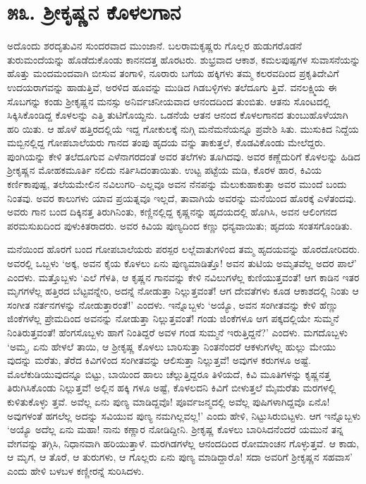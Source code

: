 
\chapter{೫೩. ಶ್ರೀಕೃಷ್ಣನ ಕೊಳಲಗಾನ}

ಅದೊಂದು ಶರದೃತುವಿನ ಸುಂದರವಾದ ಮುಂಜಾನೆ. ಬಲರಾಮಕೃಷ್ಣರು ಗೊಲ್ಲರ ಹುಡುಗರೊಡನೆ ತುರುಮಂದೆಯನ್ನು ಹೊಡೆದುಕೊಂಡು ಕಾನನದತ್ತ ಹೊರಟರು. ಶುಭ್ರವಾದ ಆಕಾಶ, ಕಮಲಪುಷ್ಪಗಳ ಸುವಾಸನೆಯನ್ನು ಹೊತ್ತು ಮಂದಮಂದವಾಗಿ ಬೀಸುವ ತಂಗಾಳಿ, ನೂರಾರು ಬಗೆಯ ಹಕ್ಕಿಗಳು ತಮ್ಮ ಕಲರವದಿಂದ ಪ್ರಕೃತಿದೇವಿಗೆ ಉದಯರಾಗವನ್ನು ಹಾಡುತ್ತಿವೆ, ಅರಳಿದ ಹೂವನ್ನು ಮುಡಿದ ಗಿಡಬಳ್ಳಿಗಳು ತಲೆದೂಗು ತ್ತಿವೆ. ವನಲಕ್ಷ್ಮಿಯ ಈ ಸೊಬಗನ್ನು ಕಂಡು ಶ್ರೀಕೃಷ್ಣನ ಮನಸ್ಸು ಅನಿರ್ವಚನೀಯವಾದ ಆನಂದದಿಂದ ತುಂಬಿತು. ಆತನು ಸೊಂಟದಲ್ಲಿ ಸಿಕ್ಕಿಸಿಕೊಂಡಿದ್ದ ಕೊಳಲನ್ನು ಎತ್ತಿ ತುಟಿಗೊಯ್ದನು. ಒಡನೆಯೆ ಆತನ ಆನಂದ ಕೊಳಲಗಾನದ ತುಂಬುಹೊಳೆಯಾಗಿ ಹರಿ ಯಿತು. ಆ ಹೊಳೆ ಹತ್ತಿರದಲ್ಲಿಯೆ ಇದ್ದ ಗೋಕುಲಕ್ಕೆ ನುಗ್ಗಿ ಮನೆಮನೆಯನ್ನೂ ಪ್ರವೇಶಿ ಸಿತು. ಮುಸುಕಿದ ನಿದ್ದೆಯ ಮಬ್ಬಿನಲ್ಲಿದ್ದ ಗೋಪಬಾಲೆಯರು ಗಾನದ ತಂಪು ಹೃದಯ ವನ್ನು ತಾಕುತ್ತಲೆ, ಕೊಡವಿಕೊಂಡು ಮೇಲೆದ್ದರು. ಪುಂಗಿಯನ್ನು ಕೇಳಿ ತಲೆದೂಗುವ ಎಳೆನಾಗರದಂತೆ ಅವರ ತಲೆಗಳು ತೂಗಿದವು. ಅವರ ಕಣ್ಣೆದುರಿಗೆ ಕೊಳಲನ್ನು ಹಿಡಿದ ಶ್ರೀಕೃಷ್ಣನ ಮೋಹಕಮೂರ್ತಿ ನಲಿದು ನರ್ತಿಸಿದಂತಾಯಿತು. ಉಟ್ಟ ಪಟ್ಟೆಯ ಮಡಿ, ಕೊರಳ ಹಾರ, ಕಿವಿಯ ಕರ್ಣಿಕಾಪುಷ್ಪ, ತಲೆಯಮೇಲಿನ ನವಿಲುಗರಿ–ಎಲ್ಲವೂ ಅವನ ನೆನಪನ್ನು ಮೆಲುಕುಹಾಕುತ್ತಾ ಅವರ ಮುಂದೆ ಬಂದು ನಿಂತವು. ಅವರ ಕಾಲುಗಳು ಯಾವ ಪ್ರಯತ್ನವೂ ಇಲ್ಲದೆ, ತಾವಾಗಿಯೆ ಅವರನ್ನು ಮನೆಯಿಂದ ಹೊರಕ್ಕೆ ಎಳೆತಂದವು. ಅವರು ಗಾನ ಬಂದ ದಿಕ್ಕಿನತ್ತ ತಿರುಗಿನಿಂತು, ಕಣ್ಣಿನಲ್ಲಿದ್ದ ಕೃಷ್ಣನನ್ನು ಹೃದಯದಲ್ಲಿ ಹೊಗಿಸಿ, ಅವನ ಆಲಿಂಗನದ ಪರಮಸುಖದಿಂದ ಪುಳುಕಿತರಾದರು. ಅವರ ಕಿವಿಯ ಪುಣ್ಯದಿಂದ ಕಣ್ಣು ಧನ್ಯವಾಯಿತು; ಹೃದಯ ಸಂತಸಗೊಂಡಿತು.

ಮನೆಯಿಂದ ಹೊರಗೆ ಬಂದ ಗೋಪಬಾಲೆಯರು ಪರಸ್ಪರ ಲಲ್ಲೆವಾತುಗಳಿಂದ ತಮ್ಮ ಹೃದಯವನ್ನು ಹೊರದೋರಿದರು. ಅವರಲ್ಲಿ ಒಬ್ಬಳು ‘ಅಕ್ಕ, ಅವನ ಕೈಯ ಕೊಳಲು ಏನು ಪುಣ್ಯಮಾಡಿತ್ತೊ! ಅವನ ತುಟಿಯ ಅಮೃತವೆಲ್ಲ ಅದರ ಪಾಲೆ’ ಎಂದಳು. ಮತ್ತೊಬ್ಬಳು ‘ಎಲೆ ಗೆಳತಿ, ಆ ಕೃಷ್ಣನ ಗಾನವನ್ನು ಕೇಳಿ ನವಿಲುಗಳೆಲ್ಲ ಕುಣಿಯುತ್ತವಂತೆ! ಆಗ ಕಾಡಿನ ಇತರ ಮೃಗಗಳೆಲ್ಲ ಹತ್ತಿರದ ಬೆಟ್ಟವನ್ನೇರಿ, ಅದನ್ನೆ ನೋಡುತ್ತಾ ನಿಲ್ಲುತ್ತವಂತೆ! ಆಗ ದೇವತೆಗಳು ಕೂಡ ಆಕಾಶದಲ್ಲಿ ನಿಂತು ಆ ಸಂಗೀತ ನರ್ತನಗಳನ್ನು ನೋಡುತ್ತಾರಂತೆ!’ ಎಂದಳು. ಇನ್ನೊಬ್ಬಳು ‘ಅಯ್ಯೊ, ಅವನ ಸಂಗೀತವನ್ನು ಕೇಳಿ ಹೆಣ್ಣು ಜಿಂಕೆಗಳೆಲ್ಲ ಪ್ರೇಮದಿಂದ ಅವನನ್ನು ನೋಡುತ್ತಾ ನಿಲ್ಲುತ್ತವಂತೆ! ಗಂಡು ಜಿಂಕೆಗಳೂ ಆಗ ಪಕ್ಕದಲ್ಲಿಯೇ ಸುಮ್ಮನೆ ನಿಂತಿರುತ್ತವಂತೆ! ಹೆಂಗಸೊಬ್ಬಳು ಹಾಗೆ ನಿಂತಿದ್ದರೆ ಅವಳ ಗಂಡ ಸುಮ್ಮನೆ ಇರುತ್ತಿದ್ದನೆ?’ ಎಂದಳು. ಮಗದೊಬ್ಬಳು ‘ಅಮ್ಮ, ಏನು ಹೇಳಲೆ ತಾಯಿ, ಆ ಶ್ರೀಕೃಷ್ಣ ಕೊಳಲು ಬಾರಿಸುತ್ತಾ ನಿಂತನೆಂದರೆ ಆಕಳುಗಳೆಲ್ಲ ಹುಲ್ಲು ಮೇಯು ವುದನ್ನು ಮರೆತು, ತೆರೆದ ಕಿವಿಗಳಿಂದ ಸಂಗೀತವನ್ನು ಆಲಿಸುತ್ತಾ ನಿಲ್ಲುತ್ತವೆ! ಅವುಗಳ ಕರುಗಳೂ ಅಷ್ಟೆ. ಮೊಲೆಕುಡಿಯುವುದನ್ನೂ ಬಿಟ್ಟು, ಬಾಯಿಂದ ಹಾಲು ಚೆಲ್ಲುತ್ತಿದ್ದರೂ ತಿಳಿಯದೆ, ಕಿವಿ ಮೂತಿಗಳನ್ನು ಕೃಷ್ಣನತ್ತ ತಿರುಗಿಸಿಕೊಂಡು ನಿಲ್ಲುತ್ತವೆ! ಅಲ್ಲಿನ ಹಕ್ಕಿ ಗಳೂ ಅಷ್ಟೆ, ಕೊಳಲದನಿ ಕಿವಿಗೆ ಬೀಳುತ್ತಲೆ ಮೈಮರೆತು ಮರಗಳಲ್ಲಿ ಕುಳಿತುಕೊಳ್ಳು ತ್ತವೆ. ಅವೆಲ್ಲ ಏನು ಪುಣ್ಯ ಮಾಡಿದ್ದವೊ! ಪೂರ್ವಜನ್ಮದಲ್ಲಿ ಅವೆಲ್ಲ ಪುಷಿಗಳಾಗಿದ್ದವೊ ಏನೊ! ಅವುಗಳಂತೆ ಹಗಲೆಲ್ಲ ಅದನ್ನು ಸವಿಯುವ ಪುಣ್ಯ ನಮಗಿಲ್ಲವಲ್ಲ!’ ಎಂದು ಹೇಳಿ, ನಿಟ್ಟುಸಿರುಬಿಟ್ಟಳು. ಆಗ ಇನ್ನೊಬ್ಬಳು ‘ಅಯ್ಯೊ ಅದೆಲ್ಲ ಏನು ಮಹಾ! ನಾನು ಕಣ್ಣಾರ ನೋಡಿದ್ದೀನಿ. ಶ್ರೀಕೃಷ್ಣ ಕೊಳಲು ಬಾರಿಸಿದನೆಂದರೆ ಯಮುನೆ ತನ್ನ ವೇಗವನ್ನು ತಗ್ಗಿಸಿ, ನಿಧಾನವಾಗಿ ಹರಿಯುತ್ತಾಳೆ. ಮರಗಿಡಗಳೆಲ್ಲ ಆನಂದದಿಂದ ರೋಮಾಂಚನ ಗೊಳ್ಳುತ್ತವೆ. ಆ ಕಾಡು, ಆ ಮೃಗ, ಆ ತೊರೆ, ಆ ತುರುಗಳು, ಆ ಗೊಲ್ಲರು ಏನು ಪುಣ್ಯ ಮಾಡಿದ್ದಾರೊ! ಸದಾ ಅವರಿಗೆ ಶ್ರೀಕೃಷ್ಣನ ಸಹವಾಸ’ ಎಂದು ಹೇಳಿ ಬಳಬಳ ಕಣ್ಣೀರನ್ನೆ ಸುರಿಸಿದಳು.

